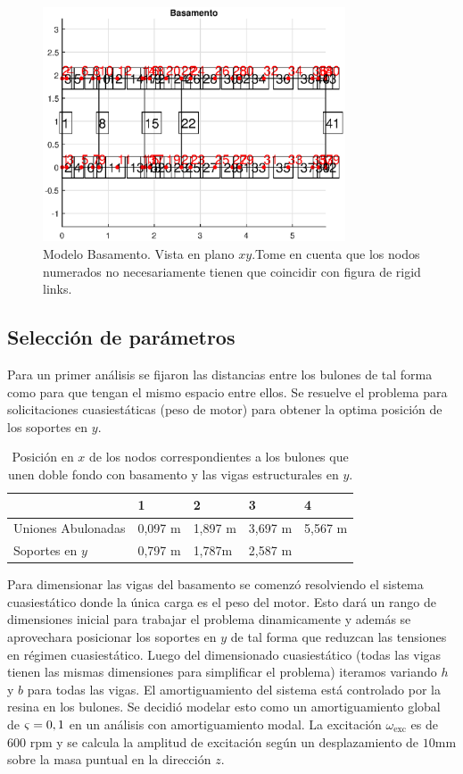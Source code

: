 \documentclass[onecolumn,10pt,titlepage,a4paper]{article}
\begin{document}
\begin{figure}[htb!]
	\centering
	\includegraphics[width=0.8\textwidth]{fig/modelbasamento.eps}
	\caption{Modelo Basamento. Vista en plano $x\!y$.Tome en cuenta que los nodos numerados no necesariamente tienen que coincidir con figura de rigid links.}
	\label{fig:modelobasamento}
\end{figure}

\subsection*{Selección de parámetros}
Para un primer análisis se fijaron las distancias entre los bulones de tal forma como para que tengan el mismo espacio entre ellos. Se resuelve el problema para solicitaciones cuasiestáticas (peso de motor) para obtener la optima posición de los soportes en $y$.


\begin{table}[htb!]
	\centering
	\begin{tabular}{lllll}
		& 1 & 2 & 3 & 4 \\ \hline
		Uniones Abulonadas& 0,097 \si{\meter}  & 1,897 \si{ \meter} & 3,697 \si{ \meter} & 5,567 \si{ \meter} \\
		Soportes en $y$& 0,797 \si{\meter}  &1,787\si{\meter}   & 2,587 \si{\meter}  &  \\
	\end{tabular}
\caption{Posición en $x$ de los nodos correspondientes a los bulones que unen doble fondo con basamento y las vigas estructurales en $y$.}
\end{table}

Para dimensionar las vigas del basamento se comenzó resolviendo el sistema cuasiestático donde la única carga es el peso del motor. Esto dará un rango de dimensiones inicial para trabajar el problema dinamicamente y además se aprovechara posicionar los soportes en $y$ de tal forma que reduzcan las tensiones en régimen cuasiestático. Luego del dimensionado cuasiestático (todas las vigas tienen las mismas dimensiones para simplificar el problema) iteramos variando $h$ y $b$ para todas las vigas. El amortiguamiento del sistema está controlado por la resina en los bulones. Se decidió modelar esto como un amortiguamiento global de $\varsigma = 0,1$ en un análisis con amortiguamiento modal. La excitación $\omega_{\mathrm{exc}}$ es de 600 rpm y se calcula la amplitud de excitación según un desplazamiento de $10$mm sobre la masa puntual en la dirección $z$.
\end{document}
